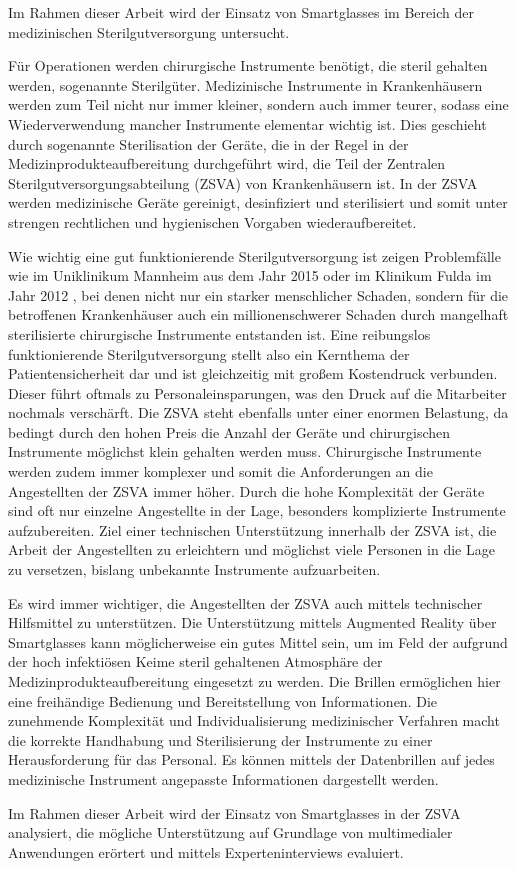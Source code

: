 Im Rahmen dieser Arbeit wird der Einsatz von Smartglasses im Bereich der medizinischen Sterilgutversorgung untersucht. 

Für Operationen werden chirurgische Instrumente benötigt, die steril gehalten werden, sogenannte Sterilgüter.
Medizinische Instrumente in Krankenhäusern werden zum Teil nicht nur immer kleiner, sondern auch immer teurer, sodass eine Wiederverwendung mancher Instrumente elementar wichtig ist. Dies geschieht durch sogenannte Sterilisation der Geräte, die in der Regel in der Medizinprodukteaufbereitung durchgeführt wird, die Teil der Zentralen Sterilgutversorgungsabteilung (ZSVA) von Krankenhäusern ist. In der ZSVA werden medizinische Geräte gereinigt, desinfiziert und sterilisiert und somit unter strengen rechtlichen und hygienischen Vorgaben wiederaufbereitet. 
%

Wie wichtig eine gut funktionierende Sterilgutversorgung ist zeigen Problemfälle wie im Uniklinikum Mannheim \cite{Brandt2015} aus dem Jahr 2015 oder im Klinikum Fulda im Jahr 2012 \cite{HygieneFuldar2012}, bei denen nicht nur ein starker menschlicher Schaden, sondern für die betroffenen Krankenhäuser auch ein millionenschwerer Schaden durch mangelhaft sterilisierte chirurgische Instrumente entstanden ist. Eine reibungslos funktionierende Sterilgutversorgung stellt also ein Kernthema der Patientensicherheit dar und ist gleichzeitig mit großem Kostendruck verbunden. Dieser führt oftmals zu Personaleinsparungen, was den Druck auf die Mitarbeiter nochmals verschärft. Die ZSVA steht ebenfalls unter einer enormen Belastung, da bedingt durch den hohen Preis die Anzahl der Geräte und chirurgischen Instrumente möglichst klein gehalten werden muss. Chirurgische Instrumente werden zudem immer komplexer und somit die Anforderungen an die Angestellten der ZSVA immer höher. Durch die hohe Komplexität der Geräte sind oft nur einzelne Angestellte in der Lage, besonders komplizierte Instrumente aufzubereiten. Ziel einer technischen Unterstützung innerhalb der ZSVA ist, die Arbeit der Angestellten zu erleichtern und möglichst viele Personen in die Lage zu versetzen, bislang unbekannte Instrumente aufzuarbeiten. 
%
%

Es wird immer wichtiger, die Angestellten der ZSVA auch mittels technischer Hilfsmittel zu unterstützen. Die Unterstützung mittels Augmented Reality über Smartglasses kann möglicherweise ein gutes Mittel sein, um im Feld der aufgrund der hoch infektiösen Keime steril gehaltenen Atmosphäre der Medizinprodukteaufbereitung eingesetzt zu werden. Die Brillen ermöglichen hier eine freihändige Bedienung und Bereitstellung von Informationen. Die zunehmende Komplexität und Individualisierung medizinischer Verfahren macht die korrekte Handhabung und Sterilisierung der Instrumente zu einer Herausforderung für das Personal. Es können mittels der Datenbrillen auf jedes medizinische Instrument angepasste Informationen dargestellt werden. 

Im Rahmen dieser Arbeit wird der Einsatz von Smartglasses in der ZSVA analysiert, die mögliche Unterstützung auf Grundlage von multimedialer Anwendungen erörtert und mittels Experteninterviews evaluiert. 